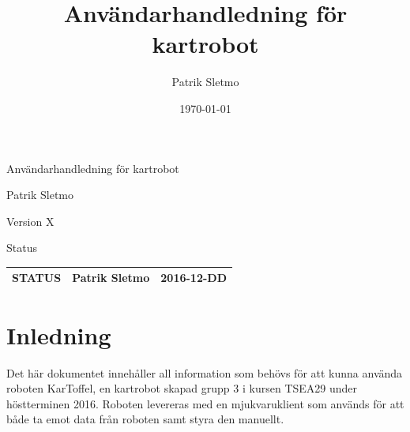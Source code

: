 \documentclass{article}
\title{Användarhandledning för kartrobot}
\author{Patrik Sletmo}
\date{\today}
\begin{document}
\thispagestyle{empty}

{
\sffamily
\centering
\large


{\huge 
Användarhandledning för kartrobot
}

{\large
Patrik Sletmo
}

{\large
Version X
}

\vspace{3.5cm}

Status
\begin{table}[H]
\centering
\begin{tabular}{ | c | c | c | }
\hline
STATUS & Patrik Sletmo & 2016-12-DD \\
\hline
\end{tabular}
\end{table}
}
\clearpage

\section{Inledning}
Det här dokumentet innehåller all information som behövs för att kunna använda roboten KarToffel, en kartrobot skapad grupp 3 i kursen TSEA29 under höstterminen 2016. Roboten levereras med en mjukvaruklient som används för att både ta emot data från roboten samt styra den manuellt. 
\end{document}
